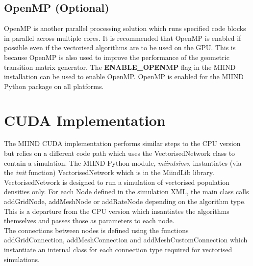 \documentclass[utf8]{frontiers_suppmat} %
\begin{document}
\subsection*{OpenMP (Optional)}
OpenMP is another parallel processing solution which runs specified code blocks in parallel across multiple cores. It is recommended that OpenMP is enabled if possible even if the vectorised algorithms are to be used on the GPU. This is because OpenMP is also used to improve the performance of the geometric transition matrix generator. The \textbf{ENABLE\_OPENMP} flag in the MIIND installation can be used to enable OpenMP. OpenMP is enabled for the MIIND Python package on all platforms.\\

\section{CUDA Implementation}
\label{cudaimplement}
The MIIND CUDA implementation performs similar steps to the CPU version but relies on a different code path which uses the VectorisedNetwork class to contain a simulation. The MIIND Python module, \textit{miindsimv}, instantiates (via the \textit{init} function) VectorisedNetwork which is in the MiindLib library. VectorisedNetwork is designed to run a simulation of vectorised population densities only. For each Node defined in the simulation XML, the main class calls addGridNode, addMeshNode or addRateNode depending on the algorithm type. This is a departure from the CPU version which insantiates the algorithms themselves and passes those as parameters to each node.\\
The connections between nodes is defined using the functions addGridConnection, addMeshConnection and addMeshCustomConnection which instantiate an internal class for each connection type required for vectorised simulations.\\
\end{document}
